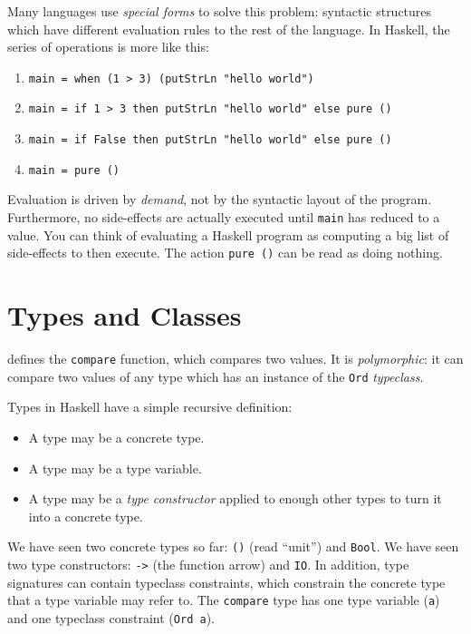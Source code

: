 Many languages use \emph{special forms} to solve this problem: syntactic
structures which have different evaluation rules to the rest of the language.
In Haskell, the series of operations is more like this:

\begin{enumerate}
\item \verb|main = when (1 > 3) (putStrLn "hello world")|
\item \verb|main = if 1 > 3 then putStrLn "hello world" else pure ()|
\item \verb|main = if False then putStrLn "hello world" else pure ()|
\item \verb|main = pure ()|
\end{enumerate}

Evaluation is driven by \emph{demand}, not by the syntactic layout of the
program.  Furthermore, no side-effects are actually executed until \verb|main|
has reduced to a value.  You can think of evaluating a Haskell program as
computing a big list of side-effects to then execute.  The action \verb|pure ()|
can be read as doing nothing.

\begin{figure}[b]
  \hrulefill
  \centering
  
  \label{fig:compare}
\end{figure}

\section*{Types and Classes}

 defines the \verb|compare| function, which compares two values.
It is \emph{polymorphic}: it can compare two values of any type which has an
instance of the \verb|Ord| \emph{typeclass}.

Types in Haskell have a simple recursive definition:

\begin{itemize}
\item A type may be a concrete type.
\item A type may be a type variable.
\item A type may be a \emph{type constructor} applied to enough other types to
  turn it into a concrete type.
\end{itemize}

We have seen two concrete types so far: \verb|()| (read ``unit'') and
\verb|Bool|.  We have seen two type constructors: \verb|->| (the function arrow)
and \verb|IO|.  In addition, type signatures can contain typeclass constraints,
which constrain the concrete type that a type variable may refer to.  The
\verb|compare| type has one type variable (\verb|a|) and one typeclass
constraint (\verb|Ord a|).


